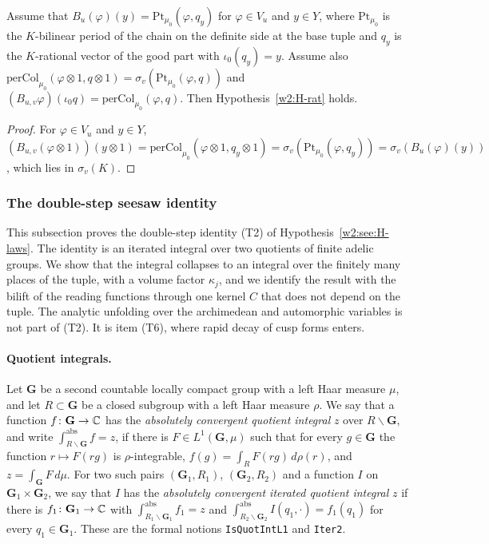 \begin{lemma}[rationality]\label{w2:see:rat}
Assume that $B_u(\varphi)(y)=\mathrm{Pt}_{\mu_0}(\varphi,q_y)$ for $\varphi\in V_u$ and $y\in Y$, where $\mathrm{Pt}_{\mu_0}$ is the $K$-bilinear period of the chain on the definite side at the base tuple and $q_y$ is the $K$-rational vector of the good part with $\iota_0(q_y)=y$. Assume also $\mathrm{perCol}_{\mu_0}(\varphi\otimes1,q\otimes1)=\sigma_v(\mathrm{Pt}_{\mu_0}(\varphi,q))$ and $(B_{u,v}\varphi)(\iota_0q)=\mathrm{perCol}_{\mu_0}(\varphi,q)$. Then Hypothesis~\ref{w2:H-rat} holds.
\end{lemma}

\begin{proof}
For $\varphi\in V_u$ and $y\in Y$, $(B_{u,v}(\varphi\otimes1))(y\otimes1)=\mathrm{perCol}_{\mu_0}(\varphi\otimes1,q_y\otimes1)=\sigma_v(\mathrm{Pt}_{\mu_0}(\varphi,q_y))=\sigma_v(B_u(\varphi)(y))$, which lies in $\sigma_v(K)$.
\end{proof}



\subsubsection{The double-step seesaw identity}\label{w3s:sec}

This subsection proves the double-step identity (T2) of Hypothesis~\ref{w2:see:H-laws}. The identity is an iterated integral over two quotients of finite adelic groups. We show that the integral collapses to an integral over the finitely many places of the tuple, with a volume factor $\kappa_j$, and we identify the result with the bilift of the reading functions through one kernel $C$ that does not depend on the tuple. The analytic unfolding over the archimedean and automorphic variables is not part of (T2). It is item (T6), where rapid decay of cusp forms enters.

\paragraph{Quotient integrals.} Let $\mathbf G$ be a second countable locally compact group with a left Haar measure $\mu$, and let $R\subset\mathbf G$ be a closed subgroup with a left Haar measure $\rho$. We say that a function $f\colon\mathbf G\to\mathbb C$ has the \emph{absolutely convergent quotient integral} $z$ over $R\backslash\mathbf G$, and write $\int^{\mathrm{abs}}_{R\backslash\mathbf G}f=z$, if there is $F\in L^1(\mathbf G,\mu)$ such that for every $g\in\mathbf G$ the function $r\mapsto F(rg)$ is $\rho$-integrable, $f(g)=\int_RF(rg)\,d\rho(r)$, and $z=\int_{\mathbf G}F\,d\mu$. For two such pairs $(\mathbf G_1,R_1)$, $(\mathbf G_2,R_2)$ and a function $I$ on $\mathbf G_1\times\mathbf G_2$, we say that $I$ has the \emph{absolutely convergent iterated quotient integral} $z$ if there is $f_1\colon\mathbf G_1\to\mathbb C$ with $\int^{\mathrm{abs}}_{R_1\backslash\mathbf G_1}f_1=z$ and $\int^{\mathrm{abs}}_{R_2\backslash\mathbf G_2}I(q_1,\cdot)=f_1(q_1)$ for every $q_1\in\mathbf G_1$. These are the formal notions \texttt{IsQuotIntL1} and \texttt{Iter2}.

